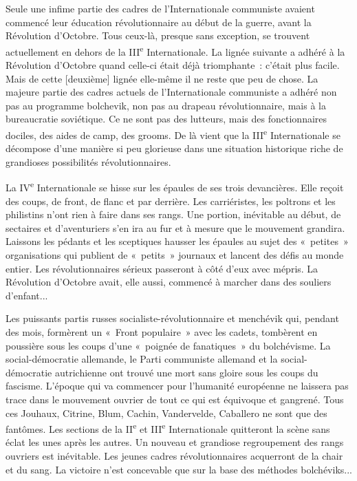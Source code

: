 \documentclass[french,twoside]{book} %
\newcommand\corr[1]{#1}
\begin{document}
Seule une infime partie des cadres de l’Internationale communiste avaient commencé leur éducation révolutionnaire au début de la guerre, avant la Révolution d’Octobre. Tous ceux-là, presque sans exception, se trouvent actuellement en dehors de la III\textsuperscript{e} Internationale. La lignée suivante a adhéré à la Révolution d’Octobre quand celle-ci était déjà triomphante : c’était plus facile. Mais de cette [{\corr deuxième}] lignée elle-même il ne reste que peu de chose. La majeure partie des cadres actuels de l’Internationale communiste a adhéré non pas au programme bolchevik, non pas au drapeau révolutionnaire, mais à la bureaucratie soviétique. Ce ne sont pas des lutteurs, mais des fonctionnaires dociles, des aides de camp, des grooms. De là vient que la III\textsuperscript{e} Internationale se décompose d’une manière si peu glorieuse dans une situation historique riche de grandioses possibilités révolutionnaires.\par
La IV\textsuperscript{e} Internationale se hisse sur les épaules de ses trois devancières. Elle reçoit des coups, de front, de flanc et par derrière. Les carriéristes, les poltrons et les philistins n’ont rien à faire dans ses rangs. Une portion, inévitable au début, de sectaires et d’aventuriers s’en ira au fur et à mesure que le mouvement grandira. Laissons les pédants et les sceptiques hausser les épaules au sujet des « petites » organisations qui publient de « petits » journaux et lancent des défis au monde entier. Les révolutionnaires sérieux passeront à côté d’eux avec mépris.  La Révolution d’Octobre avait, elle aussi, commencé à marcher dans des souliers d’enfant...\par
Les puissants partis russes socialiste-révolutionnaire et menchévik qui, pendant des mois, formèrent un « Front populaire » avec les cadets, tombèrent en poussière sous les coups d’une « poignée de fanatiques » du bolchévisme. La social-démocratie allemande, le Parti communiste allemand et la social-démocratie autrichienne ont trouvé une mort sans gloire sous les coups du fascisme. L’époque qui va commencer pour l’humanité européenne ne laissera pas trace dans le mouvement ouvrier de tout ce qui est équivoque et gangrené. Tous ces Jouhaux, Citrine, Blum, Cachin, Vandervelde, Caballero ne sont que des fantômes. Les sections de la II\textsuperscript{e} et III\textsuperscript{e} Internationale quitteront la scène sans éclat les unes après les autres. Un nouveau et grandiose regroupement des rangs ouvriers est inévitable. Les jeunes cadres révolutionnaires acquerront de la chair et du sang. La victoire n’est concevable que sur la base des méthodes bolchéviks...
\end{document}
